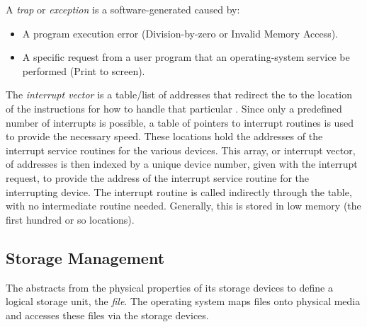 \begin{definition}[Trap]\label{def:Trap}
  A \emph{trap} or \emph{exception} is a software-generated  caused by:
  \begin{itemize}[noitemsep]
  \item A program execution error (Division-by-zero or Invalid Memory Access).
  \item A specific request from a user program that an operating-system service be performed (Print to screen).
  \end{itemize}
\end{definition}

\begin{definition}\label{def:Interrupt_Vector}
  The \emph{interrupt vector} is a table/list of addresses that redirect the  to the location of the instructions for how to handle that particular .
  Since only a predefined number of interrupts is possible, a table of pointers to interrupt routines is used to provide the necessary speed.
  These locations hold the addresses of the interrupt service routines for the various devices.
  This array, or interrupt vector, of addresses is then indexed by a unique device number, given with the interrupt request, to provide the address of the interrupt service routine for the interrupting device.
  The interrupt routine is called indirectly through the table, with no intermediate routine needed.
  Generally, this is stored in low memory (the first hundred or so locations).
\end{definition}

\subsection{Storage Management}\label{subsec:Storage_Management}
\begin{definition}[File]\label{def:File}
  The  abstracts from the physical properties of its storage devices to define a logical storage unit, the \emph{file}.
  The operating system maps files onto physical media and accesses these files via the storage devices.
\end{definition}







